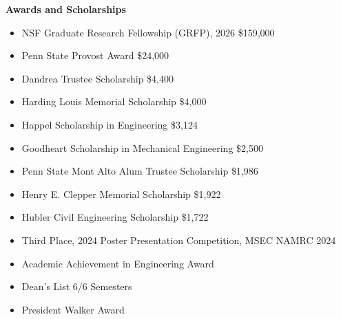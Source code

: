 \begin{center}
    \textbf{Awards and Scholarships}
\end{center}

\begin{itemize}[noitemsep, topsep=0pt, partopsep=0pt, parsep=0pt]
    \item NSF Graduate Research Fellowship (GRFP), 2026 \hfill \$159,000
    \item Penn State Provost Award \hfill \$24,000
    \item Dandrea Trustee Scholarship \hfill \$4,400
    \item Harding Louis Memorial Scholarship \hfill \$4,000
    \item Happel Scholarship in Engineering
    \hfill \$3,124
    \item Goodheart Scholarship in Mechanical Engineering
    \hfill \$2,500
    \item Penn State Mont Alto Alum Trustee Scholarship \hfill \$1,986
    \item Henry E. Clepper Memorial Scholarship \hfill \$1,922
    \item Hubler Civil Engineering Scholarship \hfill \$1,722


    \item Third Place, 2024 Poster Presentation Competition, MSEC NAMRC 2024
    

    \item Academic Achievement in Engineering Award
    
    \item Dean's List 6/6 Semesters

    \item President Walker Award
    
    
\end{itemize}
